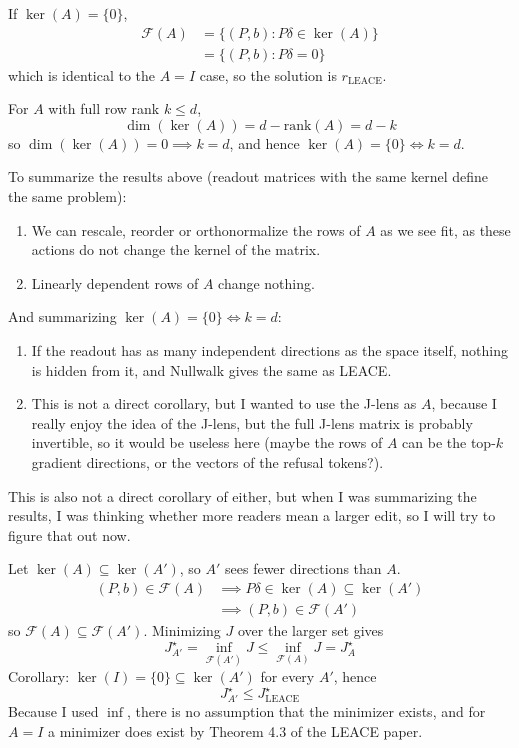 \documentclass[10pt,a4paper,twocolumn]{article}
\begin{document}
	If $\ker(A) = \{0\}$,
	$$\begin{aligned}
		\mathcal{F}(A) & = \{ (P, b) : P \delta \in \ker(A) \} \\
		& = \{ (P, b) : P \delta = 0 \}
	\end{aligned}$$
	which is identical to the $A = I$ case, so the solution is $r_{\mathrm{LEACE}}$.

	For $A$ with full row rank $k \le d$,
	$$\dim(\ker(A)) = d - \mathrm{rank}(A) = d - k$$
	so $\dim(\ker(A)) = 0 \implies k = d$, and hence $\ker(A) = \{0\} \iff k = d$.

	To summarize the results above (readout matrices with the same kernel define the same problem):
	\begin{enumerate}
		\item We can rescale, reorder or orthonormalize the rows of $A$ as we see fit, as these actions do not change the kernel of the matrix.
		\item Linearly dependent rows of $A$ change nothing.
	\end{enumerate}
	And summarizing $\ker(A) = \{0\} \iff k = d$:
	\begin{enumerate}
		\item If the readout has as many independent directions as the space itself, nothing is hidden from it, and Nullwalk gives the same as LEACE.
		\item This is not a direct corollary, but I wanted to use the J-lens as $A$, because I really enjoy the idea of the J-lens, but the full J-lens matrix is probably invertible, so it would be useless here (maybe the rows of $A$ can be the top-$k$ gradient directions, or the vectors of the refusal tokens?).
	\end{enumerate}

	This is also not a direct corollary of either, but when I was summarizing the results, I was thinking whether more readers mean a larger edit, so I will try to figure that out now.

	Let $\ker(A) \subseteq \ker(A')$, so $A'$ sees fewer directions than $A$.
	$$\begin{aligned}
		(P, b) \in \mathcal{F}(A) & \implies P \delta \in \ker(A) \subseteq \ker(A') \\
		& \implies (P, b) \in \mathcal{F}(A')
	\end{aligned}$$
	so $\mathcal{F}(A) \subseteq \mathcal{F}(A')$. Minimizing $J$ over the larger set gives
	$$J^\star_{A'} = \inf_{\mathcal{F}(A')} J \le \inf_{\mathcal{F}(A)} J = J^\star_A$$
	Corollary: $\ker(I) = \{0\} \subseteq \ker(A')$ for every $A'$, hence
	$$J^\star_{A'} \le J^\star_{\mathrm{LEACE}}$$
	Because I used $\inf$, there is no assumption that the minimizer exists, and for $A = I$ a minimizer does exist by Theorem 4.3 of the LEACE paper.
\end{document}
